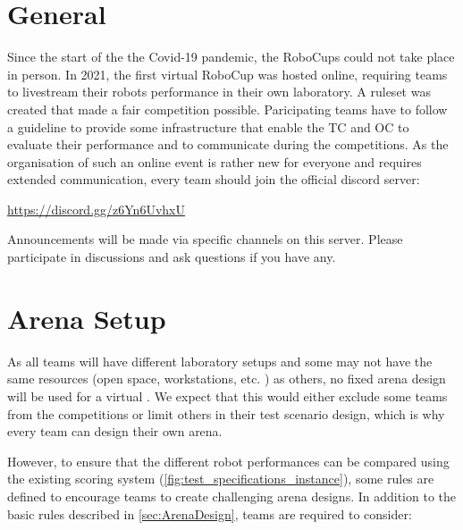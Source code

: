 
\section{General} 
\label{sec:VRCGeneral}

Since the start of the the Covid-19 pandemic, the RoboCups could not take place in person.
In 2021, the first virtual RoboCup was hosted online, requiring teams to livestream their robots performance in their own laboratory.
A ruleset was created that made a fair competition possible.
Paricipating teams have to follow a guideline to provide some infrastructure that enable the TC and OC to evaluate their performance and to communicate during the competitions.
As the organisation of such an online event is rather new for everyone and requires extended communication, 
every team should join the official \RCAW discord server:

\href{Official Discord Server}{https://discord.gg/z6Yn6UvhxU}

Announcements will be made via specific channels on this server.
Please participate in discussions and ask questions if you have any.

\section{Arena Setup} 
\label{sec:VRCArenaSetup}

As all teams will have different laboratory setups and some may not have the same resources (open space, workstations, etc. ) as others, no fixed arena design will be used for a virtual \RCAW. We expect that this would either exclude some teams from the competitions or limit others in their test scenario design, which is why every team can design their own arena.

However, to ensure that the different robot performances can be compared using the existing scoring system (\ref{fig:test_specifications_instance}), some rules are defined to encourage teams to create challenging arena designs. In addition to the basic rules described in \ref{sec:ArenaDesign}, teams are required to consider: 
  
